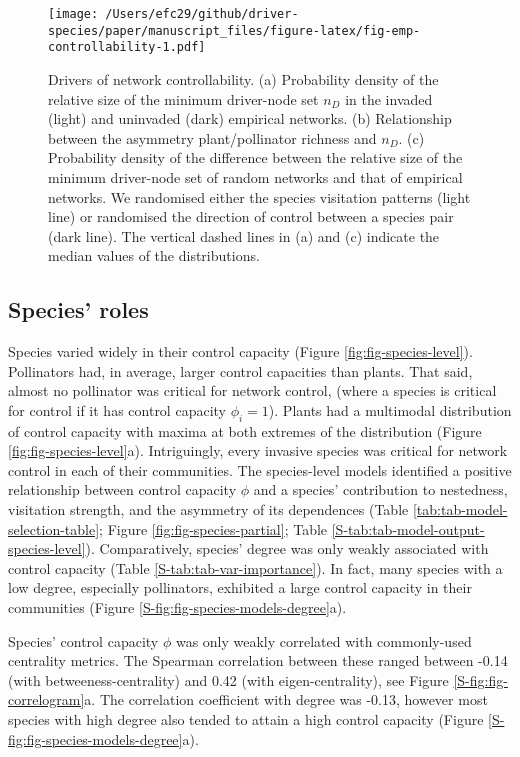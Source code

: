 \documentclass[a4paper]{artikel1}
\theoremstyle{definition}
\theoremstyle{definition}
\theoremstyle{definition}
\theoremstyle{remark}
\begin{document}
\begin{figure}
\centering
\texttt{[image: /Users/efc29/github/driver-species/paper/manuscript\_files/figure-latex/fig-emp-controllability-1.pdf]}
\caption{\label{fig:fig-emp-controllability}Drivers of network
controllability. (a) Probability density of the relative size of the
minimum driver-node set \(n_D\) in the invaded (light) and uninvaded
(dark) empirical networks. (b) Relationship between the asymmetry
plant/pollinator richness and \(n_D\). (c) Probability density of the
difference between the relative size of the minimum driver-node set of
random networks and that of empirical networks. We randomised either the
species visitation patterns (light line) or randomised the direction of
control between a species pair (dark line). The vertical dashed lines in
(a) and (c) indicate the median values of the distributions.}
\end{figure}

\subsection{Species' roles}\label{species-roles-1}

Species varied widely in their control capacity (Figure
\ref{fig:fig-species-level}). Pollinators had, in average, larger
control capacities than plants. That said, almost no pollinator was
critical for network control, (where a species is critical for control
if it has control capacity \(\phi_i = 1\)). Plants had a multimodal
distribution of control capacity with maxima at both extremes of the
distribution (Figure \ref{fig:fig-species-level}a). Intriguingly, every
invasive species was critical for network control in each of their
communities. The species-level models identified a positive relationship
between control capacity \(\phi\) and a species' contribution to
nestedness, visitation strength, and the asymmetry of its dependences
(Table \ref{tab:tab-model-selection-table}; Figure
\ref{fig:fig-species-partial}; Table
\ref{S-tab:tab-model-output-species-level}). Comparatively, species'
degree was only weakly associated with control capacity (Table
\ref{S-tab:tab-var-importance}). In fact, many species with a low
degree, especially pollinators, exhibited a large control capacity in
their communities (Figure \ref{S-fig:fig-species-models-degree}a).

Species' control capacity \(\phi\) was only weakly correlated with
commonly-used centrality metrics. The Spearman correlation between these
ranged between -0.14 (with betweeness-centrality) and 0.42 (with
eigen-centrality), see Figure \ref{S-fig:fig-correlogram}a. The
correlation coefficient with degree was -0.13, however most species with
high degree also tended to attain a high control capacity (Figure
\ref{S-fig:fig-species-models-degree}a).
\end{document}
